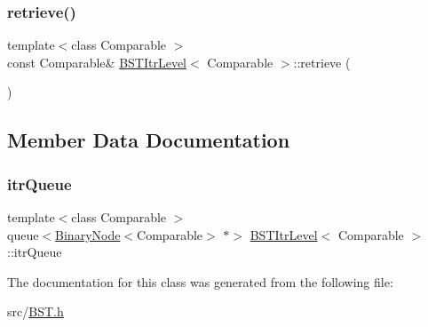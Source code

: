 \mbox{\label{classBSTItrLevel_a7932a172129cc6ca14b6efeee1b4dd87}} 
\subsubsection{\texorpdfstring{retrieve()}{retrieve()}}
{\footnotesize\ttfamily template$<$class Comparable $>$ \\
const Comparable\& \hyperlink{classBSTItrLevel}{B\+S\+T\+Itr\+Level}$<$ Comparable $>$\+::retrieve (\begin{DoxyParamCaption}{ }\end{DoxyParamCaption})\hspace{0.3cm}{\ttfamily [inline]}}



\subsection{Member Data Documentation}
\mbox{\label{classBSTItrLevel_a6de8f9f3e129e2a358b00ffa35abcb0e}} 
\subsubsection{\texorpdfstring{itr\+Queue}{itrQueue}}
{\footnotesize\ttfamily template$<$class Comparable $>$ \\
queue$<$\hyperlink{classBinaryNode}{Binary\+Node}$<$Comparable$>$ $\ast$$>$ \hyperlink{classBSTItrLevel}{B\+S\+T\+Itr\+Level}$<$ Comparable $>$\+::itr\+Queue\hspace{0.3cm}{\ttfamily [private]}}



The documentation for this class was generated from the following file\+:\begin{DoxyCompactItemize}
\item 
src/\hyperlink{BST_8h}{B\+S\+T.\+h}\end{DoxyCompactItemize}
